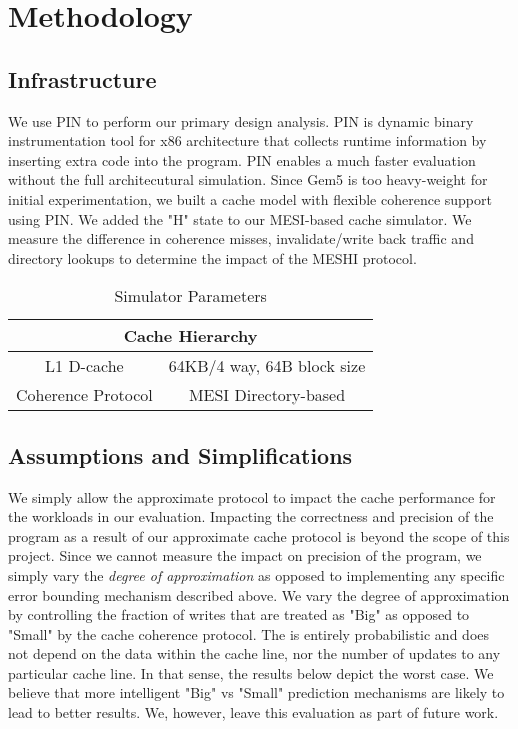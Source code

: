 \section{Methodology}
\label{sec:methodology}
\subsection{Infrastructure}
We use PIN to perform our primary design analysis. PIN is dynamic binary instrumentation tool for
x86 architecture that collects runtime information by inserting extra code into
the program. PIN enables a much
faster evaluation without the full architecutural simulation. Since Gem5 is too
heavy-weight for initial experimentation, we built a
cache model with flexible coherence support using PIN. We added the "H" state
to our MESI-based cache simulator. We measure the difference in coherence
misses, invalidate/write back traffic and directory lookups to determine the
impact of the MESHI protocol. 

\begin{table}
  \centering
  \begin{tabular}{||c|c||}
	\hline
	
	\multicolumn{2}{||c||}{\textbf{Cache Hierarchy}} \\
	\hline
	L1 D-cache & 64KB/4 way, 64B block size\\ \hline
	Coherence Protocol & MESI Directory-based \\
	\hline

  \end{tabular}
  \caption{Simulator Parameters}
  \label{table:sim_param}		

\end{table}
\subsection{Assumptions and Simplifications}
We simply allow the approximate protocol to impact the cache performance for the
workloads in our evaluation. Impacting the correctness and precision of the
program as a result of our approximate cache protocol is beyond the scope of
this project. Since we cannot measure the impact on precision of the program, we
simply vary the \emph{degree of approximation} as opposed to implementing any
specific error bounding mechanism described above. We vary the degree of
approximation by controlling the fraction of writes that are treated as "Big" as
opposed to "Small" by the cache coherence protocol. The is entirely
probabilistic and does not depend on the data within the cache line, nor the
number of updates to any particular cache line. In that sense, the results
below depict the worst case. We believe that more intelligent "Big" vs "Small"
prediction mechanisms are likely to lead to better results. We, however, leave
this evaluation as part of future work. 

